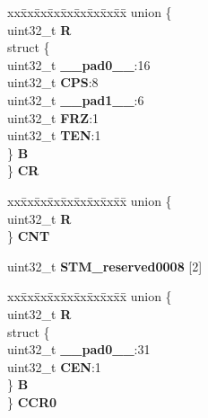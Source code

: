 \begin{DoxyCompactItemize}
\begin{tabbing}
\end{tabbing}\item 
\mbox{\label{structSTM__tag_a55aa5470cf56358624040c14230f7f07}} 
\begin{tabbing}
xx\=xx\=xx\=xx\=xx\=xx\=xx\=xx\=xx\=\kill
union \{\\
\>uint32\_t {\bfseries R}\\
\>struct \{\\
\>\>uint32\_t {\bfseries \_\_pad0\_\_}:16\\
\>\>uint32\_t {\bfseries CPS}:8\\
\>\>uint32\_t {\bfseries \_\_pad1\_\_}:6\\
\>\>uint32\_t {\bfseries FRZ}:1\\
\>\>uint32\_t {\bfseries TEN}:1\\
\>\} {\bfseries B}\\
\} {\bfseries CR}\\

\end{tabbing}\item 
\mbox{\label{structSTM__tag_aade615141cc0195ff0a01918bb2e67b9}} 
\begin{tabbing}
xx\=xx\=xx\=xx\=xx\=xx\=xx\=xx\=xx\=\kill
union \{\\
\>uint32\_t {\bfseries R}\\
\} {\bfseries CNT}\\

\end{tabbing}\item 
\mbox{\label{structSTM__tag_a8c564bde388f90a46879582e8a06c385}} 
uint32\+\_\+t {\bfseries S\+T\+M\+\_\+reserved0008} \mbox{[}2\mbox{]}
\item 
\mbox{\label{structSTM__tag_a43063aad6f024739ac325b5b2535a268}} 
\begin{tabbing}
xx\=xx\=xx\=xx\=xx\=xx\=xx\=xx\=xx\=\kill
union \{\\
\>uint32\_t {\bfseries R}\\
\>struct \{\\
\>\>uint32\_t {\bfseries \_\_pad0\_\_}:31\\
\>\>uint32\_t {\bfseries CEN}:1\\
\>\} {\bfseries B}\\
\} {\bfseries CCR0}\\


\end{tabbing}
\end{DoxyCompactItemize}
